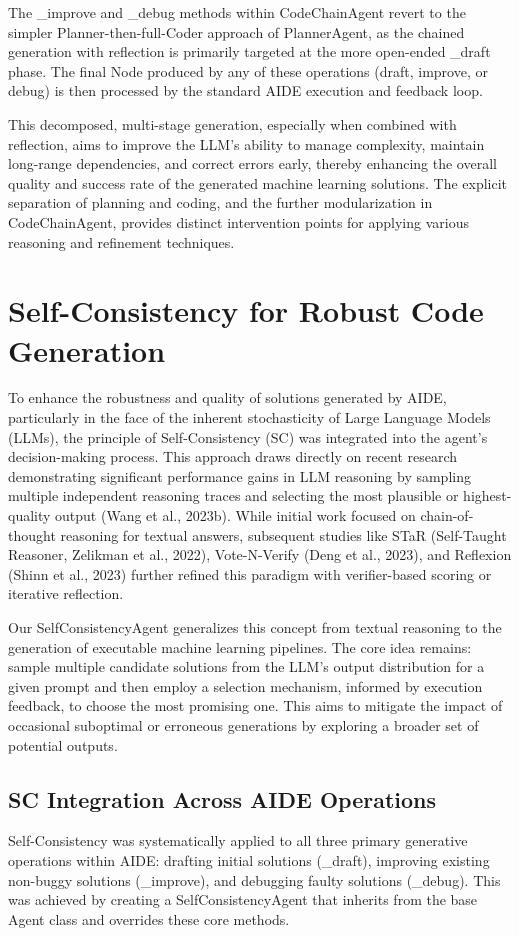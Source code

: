 The _improve and _debug methods within CodeChainAgent revert to the simpler Planner-then-full-Coder approach of PlannerAgent, as the chained generation with reflection is primarily targeted at the more open-ended _draft phase. The final Node produced by any of these operations (draft, improve, or debug) is then processed by the standard AIDE execution and feedback loop.

This decomposed, multi-stage generation, especially when combined with reflection, aims to improve the LLM's ability to manage complexity, maintain long-range dependencies, and correct errors early, thereby enhancing the overall quality and success rate of the generated machine learning solutions. The explicit separation of planning and coding, and the further modularization in CodeChainAgent, provides distinct intervention points for applying various reasoning and refinement techniques.


\section{Self-Consistency for Robust Code Generation}

To enhance the robustness and quality of solutions generated by AIDE, particularly in the face of the inherent stochasticity of Large Language Models (LLMs), the principle of Self-Consistency (SC) was integrated into the agent's decision-making process. This approach draws directly on recent research demonstrating significant performance gains in LLM reasoning by sampling multiple independent reasoning traces and selecting the most plausible or highest-quality output (Wang et al., 2023b). While initial work focused on chain-of-thought reasoning for textual answers, subsequent studies like STaR (Self-Taught Reasoner, Zelikman et al., 2022), Vote-N-Verify (Deng et al., 2023), and Reflexion (Shinn et al., 2023) further refined this paradigm with verifier-based scoring or iterative reflection.

Our SelfConsistencyAgent generalizes this concept from textual reasoning to the generation of executable machine learning pipelines. The core idea remains: sample multiple candidate solutions from the LLM's output distribution for a given prompt and then employ a selection mechanism, informed by execution feedback, to choose the most promising one. This aims to mitigate the impact of occasional suboptimal or erroneous generations by exploring a broader set of potential outputs.

\subsection{SC Integration Across AIDE Operations}
Self-Consistency was systematically applied to all three primary generative operations within AIDE: drafting initial solutions (_draft), improving existing non-buggy solutions (_improve), and debugging faulty solutions (_debug). This was achieved by creating a SelfConsistencyAgent that inherits from the base Agent class and overrides these core methods.


